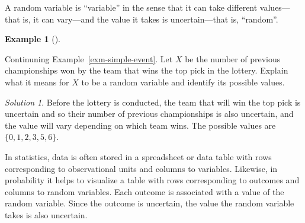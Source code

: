 \documentclass[
  letterpaper,
  DIV=11,
  numbers=noendperiod]{scrreprt}
\theoremstyle{plain}
\theoremstyle{definition}
\newtheorem{example}{Example}[chapter]
\theoremstyle{definition}
\theoremstyle{definition}
\theoremstyle{remark}
\newtheorem{refsolution}{Solution}[chapter]
\begin{document}
A random variable is ``variable'' in the sense that it can take
different values---that is, it can vary---and the value it takes is
uncertain---that is, ``random''.

\begin{tcolorbox}[enhanced jigsaw, opacityback=0, left=2mm, colframe=quarto-callout-note-color-frame, toprule=.15mm, breakable, colback=white, leftrule=.75mm, arc=.35mm, rightrule=.15mm, bottomrule=.15mm]

\begin{example}[]\protect\hypertarget{exm-rv-simple}{}\label{exm-rv-simple}

Continuning Example~\ref{exm-simple-event}. Let \(X\) be the number of
previous championships won by the team that wins the top pick in the
lottery. Explain what it means for \(X\) to be a random variable and
identify its possible values.

\end{example}

\end{tcolorbox}

\begin{tcolorbox}[enhanced jigsaw, opacityback=0, rightrule=.15mm, coltitle=black, colframe=quarto-callout-tip-color-frame, toprule=.15mm, colbacktitle=quarto-callout-tip-color!10!white, opacitybacktitle=0.6, left=2mm, toptitle=1mm, breakable, title={Solution (click to expand)}, bottomtitle=1mm, colback=white, leftrule=.75mm, titlerule=0mm, arc=.35mm, bottomrule=.15mm]

\begin{refsolution}
Before the lottery is conducted, the team that will win the top pick is
uncertain and so their number of previous championships is also
uncertain, and the value will vary depending on which team wins. The
possible values are \(\{0, 1, 2, 3, 5, 6\}\).

\label{sol-rv-simple}

\end{refsolution}

\end{tcolorbox}

In statistics, data is often stored in a spreadsheet or data table with
rows corresponding to observational units and columns to variables.
Likewise, in probability it helps to visualize a table with rows
corresponding to outcomes and columns to random variables. Each outcome
is associated with a value of the random variable. Since the outcome is
uncertain, the value the random variable takes is also uncertain.
\end{document}
